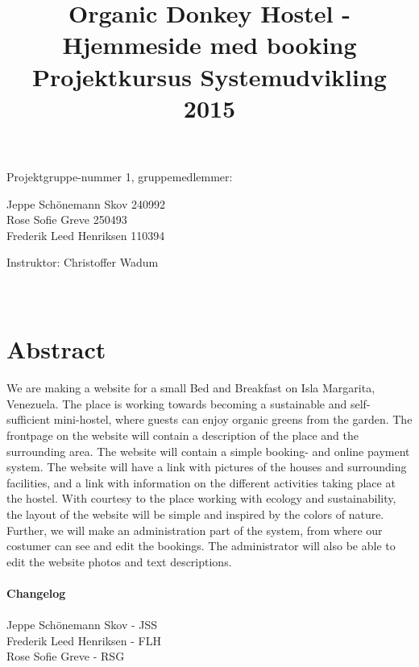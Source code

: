 \documentclass[12pt,a4paper]{article}
\begin{document}
\title{Organic Donkey Hostel - Hjemmeside med booking\\
Projektkursus Systemudvikling 2015}
\maketitle
\begin{center}
Projektgruppe-nummer 1, gruppemedlemmer:
\end{center}
\begin{center}
Jeppe Schönemann Skov 240992\\
Rose Sofie Greve 250493\\
Frederik Leed Henriksen 110394\\
\end{center}
\begin{center}
Instruktor: Christoffer Wadum\\ \hfill \\ \hfill \\ 
\end{center}
\newpage
\tableofcontents
\newpage
\section{Abstract}
We are making a website for a small Bed and Breakfast on Isla Margarita, Venezuela. The place is working towards becoming a sustainable and self-sufficient mini-hostel, where guests can enjoy organic greens from the garden.
The frontpage on the website will contain a description of the place and the surrounding area.
The website will contain a simple booking- and online payment system.
The website will have a link with pictures of the houses and surrounding facilities, and a link with information on the different activities taking place at the hostel.
With courtesy to the place working with ecology and sustainability, the layout of the website will be simple and inspired by the colors of nature.
Further, we will make an administration part of the system, from where our costumer can see and edit the bookings. The administrator will also be able to edit the website photos and text descriptions. \\\\
\textbf{Changelog}\\\\
Jeppe Schönemann Skov - JSS\\
Frederik Leed Henriksen - FLH\\
Rose Sofie Greve - RSG\\
\end{document}
